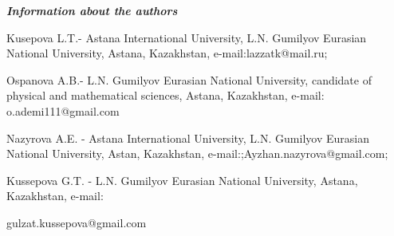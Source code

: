 \emph{{\bfseries Information about the authors}}

\begin{noparindent}
Kusepova L.T.- Astana International University, L.N. Gumilyov Eurasian
National University, Astana, Kazakhstan, e-mail:lazzatk@mail.ru;

Ospanova A.B.- L.N. Gumilyov Eurasian National University, candidate of
physical and mathematical sciences, Astana, Kazakhstan, e-mail:
o.ademi111@gmail.com

Nazyrova A.E. - Astana International University, L.N. Gumilyov Eurasian
National University, Astan, Kazakhstan,
e-mail:;Ayzhan.nazyrova@gmail.com;

Kussepova G.T. - L.N. Gumilyov Eurasian National University, Astana,
Kazakhstan, e-mail:

gulzat.kussepova@gmail.com
\end{noparindent}
